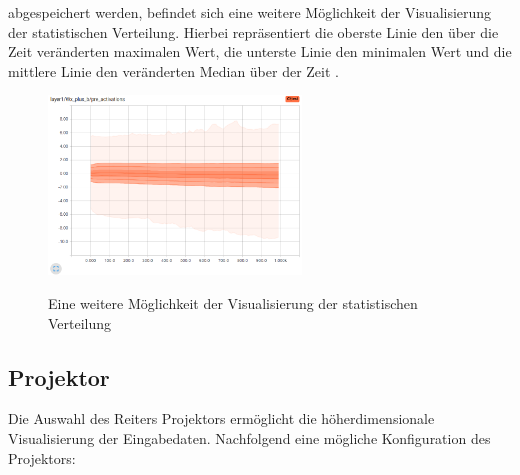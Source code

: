 abgespeichert werden, befindet sich eine weitere Möglichkeit der Visualisierung der statistischen Verteilung. Hierbei repräsentiert die oberste Linie den über die Zeit veränderten maximalen Wert, die unterste Linie den minimalen Wert und die mittlere Linie den veränderten Median über der Zeit \cite{tensorboard.2017}.

\begin{figure}[h!]
	\centering
	 \includegraphics[width=0.6\textwidth]{images/Kapitel_3/distribution.png}\\
	\vspace{10pt} 
	\caption[Eine weitere Möglichkeit der Visualisierung der statistischen Verteilung]{Eine weitere Möglichkeit der Visualisierung der statistischen Verteilung}
	\label{fig:verteilung}
\end{figure}




\subsection{Projektor}


Die Auswahl des Reiters Projektors ermöglicht die höherdimensionale Visualisierung der Eingabedaten. Nachfolgend eine mögliche Konfiguration des Projektors:
\vspace{0.1cm}
\\

